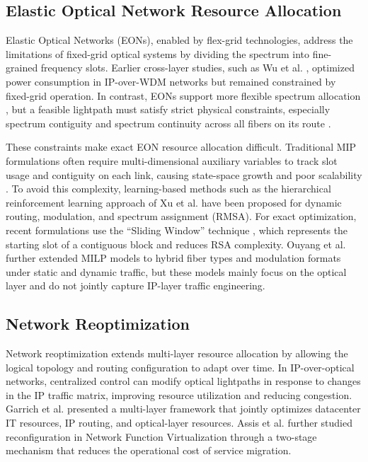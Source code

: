 \documentclass[conference]{IEEEtran}
\begin{document}
\subsection{Elastic Optical Network Resource Allocation}

Elastic Optical Networks (EONs), enabled by flex-grid technologies, address the limitations of fixed-grid optical systems by dividing the spectrum into fine-grained frequency slots. Earlier cross-layer studies, such as Wu et al. \cite{Wu2015ACO}, optimized power consumption in IP-over-WDM networks but remained constrained by fixed-grid operation. In contrast, EONs support more flexible spectrum allocation \cite{10520496}, but a feasible lightpath must satisfy strict physical constraints, especially spectrum contiguity and spectrum continuity across all fibers on its route \cite{10005186}.

These constraints make exact EON resource allocation difficult. Traditional MIP formulations often require multi-dimensional auxiliary variables to track slot usage and contiguity on each link, causing state-space growth and poor scalability \cite{10005186}. To avoid this complexity, learning-based methods such as the hierarchical reinforcement learning approach of Xu et al. \cite{10011542} have been proposed for dynamic routing, modulation, and spectrum assignment (RMSA). For exact optimization, recent formulations use the ``Sliding Window'' technique \cite{10855998}, which represents the starting slot of a contiguous block and reduces RSA complexity. Ouyang et al. \cite{10855998} further extended MILP models to hybrid fiber types and modulation formats under static and dynamic traffic, but these models mainly focus on the optical layer and do not jointly capture IP-layer traffic engineering.

\subsection{Network Reoptimization}
Network reoptimization extends multi-layer resource allocation by allowing the logical topology and routing configuration to adapt over time. In IP-over-optical networks, centralized control can modify optical lightpaths in response to changes in the IP traffic matrix, improving resource utilization and reducing congestion. Garrich et al. \cite{9133026} presented a multi-layer framework that jointly optimizes datacenter IT resources, IP routing, and optical-layer resources. Assis et al. \cite{10994541} further studied reconfiguration in Network Function Virtualization through a two-stage mechanism that reduces the operational cost of service migration.
\end{document}
